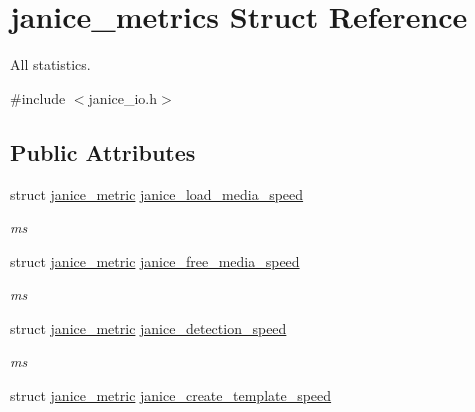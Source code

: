 \hypertarget{structjanice__metrics}{}\section{janice\+\_\+metrics Struct Reference}
\label{structjanice__metrics}


All statistics.  




{\ttfamily \#include $<$janice\+\_\+io.\+h$>$}

\subsection*{Public Attributes}
\begin{DoxyCompactItemize}
\item 
\hypertarget{structjanice__metrics_aeef58c9bd4fb6a047e3d4c93145c9d72}{}struct \hyperlink{structjanice__metric}{janice\+\_\+metric} \hyperlink{structjanice__metrics_aeef58c9bd4fb6a047e3d4c93145c9d72}{janice\+\_\+load\+\_\+media\+\_\+speed}\label{structjanice__metrics_aeef58c9bd4fb6a047e3d4c93145c9d72}

\begin{DoxyCompactList}\small\item\em ms \end{DoxyCompactList}\item 
\hypertarget{structjanice__metrics_a2583f9d35c6409a66579ea2f405b07dd}{}struct \hyperlink{structjanice__metric}{janice\+\_\+metric} \hyperlink{structjanice__metrics_a2583f9d35c6409a66579ea2f405b07dd}{janice\+\_\+free\+\_\+media\+\_\+speed}\label{structjanice__metrics_a2583f9d35c6409a66579ea2f405b07dd}

\begin{DoxyCompactList}\small\item\em ms \end{DoxyCompactList}\item 
\hypertarget{structjanice__metrics_a021b79ee7372aa254efe254c0818ca9d}{}struct \hyperlink{structjanice__metric}{janice\+\_\+metric} \hyperlink{structjanice__metrics_a021b79ee7372aa254efe254c0818ca9d}{janice\+\_\+detection\+\_\+speed}\label{structjanice__metrics_a021b79ee7372aa254efe254c0818ca9d}

\begin{DoxyCompactList}\small\item\em ms \end{DoxyCompactList}\item 
\hypertarget{structjanice__metrics_a6c30697d7bf1572f54e9cd481d0c5f76}{}struct \hyperlink{structjanice__metric}{janice\+\_\+metric} \hyperlink{structjanice__metrics_a6c30697d7bf1572f54e9cd481d0c5f76}{janice\+\_\+create\+\_\+template\+\_\+speed}\label{structjanice__metrics_a6c30697d7bf1572f54e9cd481d0c5f76}


\end{DoxyCompactItemize}
